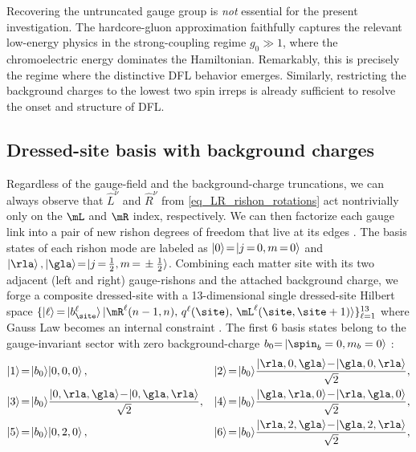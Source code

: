 \documentclass[aps,prl,reprint,twocolumn,superscriptaddress,floatfix,nofootinbib]{revtex4-2}
\begin{document}
Recovering the untruncated gauge group is \emph{not} essential for the present investigation.
The hardcore-gluon approximation faithfully captures the relevant low-energy physics in the strong-coupling regime $g_{0} \gg 1$, where the chromoelectric energy dominates the Hamiltonian.
Remarkably, this is precisely the regime where the distinctive DFL behavior emerges.
Similarly, restricting the background charges to the lowest two spin irreps is already sufficient to resolve the onset and structure of DFL.

\subsection{Dressed-site basis with background charges}
Regardless of the gauge-field and the background-charge truncations, we can always observe that $\hat{L}^{\nu}$ and $\hat{R}^{\nu}$ from \cref{eq_LR_rishon_rotations} act nontrivially only on the $\mL$ and $\mR$ index, respectively.
We can then factorize each gauge link into a pair of new rishon degrees of freedom that live at its edges \cite{Silvi2014LatticeGaugeTensor}.
The basis states of each rishon mode are labeled as
\begin{math}
    \ket{0}\!=\!\ket{j\,{=}\,0,m\,{=}\,0}
\end{math}
and
\begin{math}
    \ket{\rla},
    \ket{\gla}\!=\!\ket{j\,{=}\,\frac{1}{2},m\,{=}\,\pm\frac{1}{2}}
\end{math}.
Combining each matter site with its two adjacent (left and right) gauge-rishons and the attached background charge, we forge a composite dressed-site with a 13-dimensional single dressed-site Hilbert space
\begin{math}
    \{
    \ket{\ell}{=}
    \ket{b^{\ell}_{\site}}\ket{\mR^{\ell}({n-1,n}),\,q^{\ell}(\site),\,\mL^{\ell}({\site,\site+1})}
    \}_{\ell=1}^{13}
\end{math}
where Gauss Law becomes an internal constraint \cite{Cataldi2024Simulating2+1DSU2}.
The first 6 basis states belong to the gauge-invariant sector with zero background-charge $b_{0}{=}\ket{\spin_{b}=0,m_{b}=0}$ \cite{Calajo2024DigitalQuantumSimulation, Calajo2025QuantumManybodyScarring}:
\begin{equation}
    \label{eq_extended_basis1}
    \begin{aligned}
        \ket{1} & \!=\!\ket{b_{0}}\!\ket{0,0,0},                                              &
        \ket{2} & \!=\!\ket{b_{0}}\!\frac{\ket{\rla,0,\gla}\!-\!\ket{\gla,0,\rla}}{\sqrt{2}},   \\
        \ket{3} & \!=\!\ket{b_{0}}\!\frac{\ket{0,\rla,\gla}\!-\!\ket{0,\gla,\rla}}{\sqrt{2}}, &
        \ket{4} & \!=\!\ket{b_{0}}\!\frac{\ket{\gla,\rla,0}\!-\!\ket{\rla,\gla,0}}{\sqrt{2}},   \\
        \ket{5} & \!=\!\ket{b_{0}}\!\ket{0,2,0},                                              &
        \ket{6} & \!=\!\ket{b_{0}}\!\frac{\ket{\rla,2,\gla}\!-\!\ket{\gla,2,\rla}}{\sqrt{2}},
    \end{aligned}
\end{equation}
\end{document}
